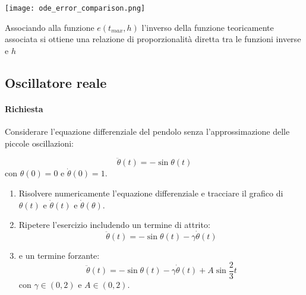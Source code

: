 \begin{enumerate}
	      \begin{marginfigure}
		      \hspace*{-2cm}
		      \texttt{[image: ode\_error\_comparison.png]}
		      \caption{Associando alla funzione $e(t_{max}, h)$ l'inverso della
			      funzione teoricamente associata si ottiene una relazione di
			      proporzionalità diretta tra le funzioni inverse e $h$}
		      \label{fig:error_comparison}
	      \end{marginfigure}





\end{enumerate}



\subsection{Oscillatore reale}

\paragraph{Richiesta}

Considerare l'equazione differenziale del pendolo senza l'approssimazione delle piccole oscillazioni:

\begin{equation}
	\ddot{\theta}(t) = -\sin{\theta(t)}
\end{equation}
con $\theta(0) = 0$ e $\dot{\theta}(0) = 1$.

\begin{enumerate}
	\item Risolvere numericamente l'equazione differenziale e tracciare il grafico di $\theta(t)$ e $\dot{\theta}(t)$ e $\dot{\theta}({\theta})$.
	\item Ripetere l'esercizio includendo un termine di attrito:
	      \[
		      \ddot{\theta}(t) = -\sin{\theta(t)} - \gamma \dot{\theta}(t)
	      \]
	\item e un termine forzante:
	      \[
		      \ddot{\theta}(t) = -\sin{\theta(t)} - \gamma \dot{\theta}(t) + A \sin{\frac{2}{3}t}
	      \]
	      con $\gamma \in (0, 2)$ e $A \in (0, 2)$.

\end{enumerate}




